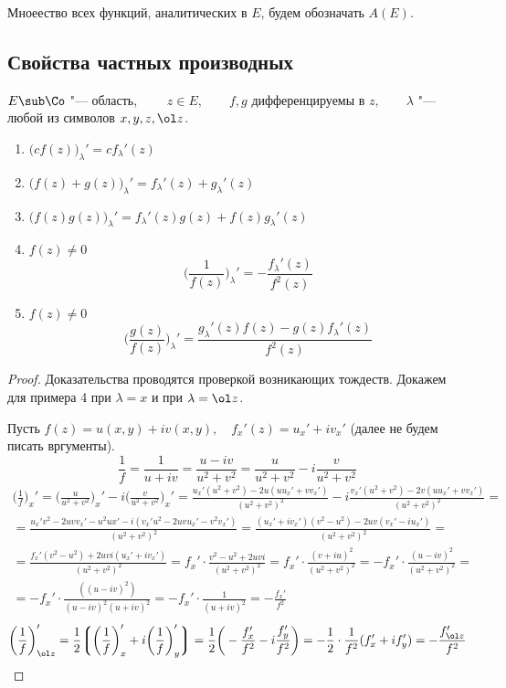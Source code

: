 \begin{notation}
	Мноеество всех функций, аналитических в $ E $, будем обозначать $ A(E) $.
\end{notation}

\subsection{Свойства частных производных}

\begin{properties}
	$ E \sub \Co $ "--- область, $ \qquad z \in E, \qquad f, g $ дифференцируемы в $ z, \qquad \lambda $ "--- любой из символов $ x, y, z, \ol z $.
	\begin{enumerate}
		\item $ \bigg( cf(z) \bigg)_\lambda' = cf_\lambda'(z) $
		\item $ \bigg( f(z) + g(z) \bigg)_\lambda' = f_\lambda'(z) + g_\lambda'(z) $
		\item $ \bigg( f(z)g(z) \bigg)_\lambda' = f_\lambda'(z)g(z) + f(z)g_\lambda'(z) $
		\item $ f(z) \ne 0 $
		$$ \bigg( \frac1{f(z)} \bigg)_\lambda' = -\frac{f_\lambda'(z)}{f^2(z)} $$
		\item $ f(z) \ne 0 $
		$$ \bigg( \frac{g(z)}{f(z)} \bigg)_\lambda' = \frac{g_\lambda'(z)f(z) - g(z)f_\lambda'(z)}{f^2(z)} $$
	\end{enumerate}
\end{properties}

\begin{proof}
	Доказательства проводятся проверкой возникающих тождеств. Докажем для примера 4 при $ \lambda = x $ и при $ \lambda = \ol z $.

	Пусть $ f(z) = u(x, y) + iv(x, y), \quad f_x'(z) = u_x' + iv_x' $ (далее не будем писать вргументы).
	$$ \frac1f = \frac1{u + iv} = \frac{u - iv}{u^2 + v^2} = \frac u{u^2 + v^2} - i \frac v{u^2 + v^2} $$
	\begin{multline*}
		\bigg( \frac1f \bigg)_x' = \bigg( \frac u{u^2 + v^2} \bigg)_x' - i \bigg( \frac v{u^2 + v^2} \bigg)_x' = \frac{u_x'(u^2 + v^2) - 2u(uu_x' + vv_x')}{(u^2 + v^2)^2} - i \frac{v_x'(u^2 + v^2) - 2v(uu_x' + vv_x')}{(u^2 + v^2)^2} = \\
		= \frac{u_x'v^2 - 2uvv_x' - u^2ux' - i(v_x'u^2 - 2uvu_x' - v^2v_x')}{(u^2 + v^2)^2} = \frac{(u_x' + iv_x')(v^2 - u^2) - 2uv(v_x' - iu_x')}{(u^2 + v^2)^2} = \\
		= \frac{f_x'(v^2 - u^2) + 2uvi(u_x' + iv_x')}{(u^2 + v^2)^2} = f_x' \cdot \frac{v^2 - u^2 + 2uvi}{(u^2 + v^2)^2} = f_x' \cdot \frac{(v + iu)^2}{(u^2 + v^2)^2} = -f_x' \cdot \frac{(u - iv)^2}{(u^2 + v^2)^2} = \\
		= -f_x' \cdot \frac{((u - iv)^2)}{(u - iv)^2(u + iv)^2} = -f_x' \cdot \frac1{(u + iv)^2} = -\frac{f_x'}{f^2}
	\end{multline*}
	$$ \bigg( \frac1f \bigg)_{\ol z}' = \frac12 \bigg\lgroup \bigg( \frac1f \bigg)_x' + i \bigg( \frac1f \bigg)_y' \bigg\rgroup = \frac12 \bigg( -\frac{f_x'}{f^2} - i \frac{f_y'}{f^2} \bigg) = -\frac12 \cdot \frac1{f^2} (f_x' + if_y') = -\frac{f_{\ol z}'}{f^2} $$
\end{proof}

